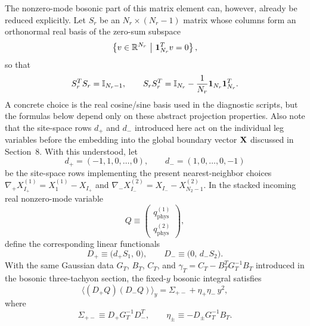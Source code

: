 \documentclass[11pt]{article}
\numberwithin{equation}{section}
\newcommand{\RR}{\mathbb{R}}
\begin{document}
The nonzero-mode bosonic part of this matrix element can, however, already be reduced explicitly. Let $S_r$ be an $N_r\times (N_r-1)$ matrix whose columns form an orthonormal real basis of the zero-sum subspace
\begin{equation}
\label{eq:s15-1-011}
\left\{v\in\RR^{N_r}~\big|~{\bf 1}_{N_r}^Tv=0\right\},
\end{equation}
so that
\begin{equation}
\label{eq:s15-1-012}
S_r^TS_r=\mathbb I_{N_r-1},
\qquad
S_rS_r^T=\mathbb I_{N_r}-\frac{1}{N_r}{\bf 1}_{N_r}{\bf 1}_{N_r}^T.
\end{equation}
A concrete choice is the real cosine/sine basis used in the diagnostic scripts, but the formulas below depend only on these abstract projection properties. Also note that the site-space rows $d_+$ and $d_-$ introduced here act on the individual leg variables before the embedding into the global boundary vector ${\bf X}$ discussed in Section~8. With this understood, let
\begin{equation}
\label{eq:s15-1-013}
d_+ = (-1,1,0,\dots,0),
\qquad
d_- = (1,0,\dots,0,-1)
\end{equation}
be the site-space rows implementing the present nearest-neighbor choices
\(
\nabla_+X_{I_+}^{(1)}=X_1^{(1)}-X_{I_+}
\)
and
\(
\nabla_-X_{I_-}^{(2)}=X_{I_-}-X_{N_2-1}^{(2)}.
\)
In the stacked incoming real nonzero-mode variable
\begin{equation}
\label{eq:s15-1-014}
Q \equiv \begin{pmatrix} q^{(1)}_{\mathrm{phys}} \\ q^{(2)}_{\mathrm{phys}} \end{pmatrix},
\end{equation}
define the corresponding linear functionals
\begin{equation}
\label{eq:s15-1-015}
D_+ \equiv \bigl(d_+S_1,\,0\bigr),
\qquad
D_- \equiv \bigl(0,\,d_-S_2\bigr).
\end{equation}
With the same Gaussian data $G_T$, $B_T$, $C_T$, and $\gamma_T=C_T-B_T^TG_T^{-1}B_T$ introduced in the bosonic three-tachyon section, the fixed-$y$ bosonic integral satisfies
\begin{equation}
\label{eq:s15-1-016}
\bigl\langle (D_+Q)(D_-Q)\bigr\rangle_y
=
\Sigma_{+-}+\eta_+\eta_-\,y^2,
\end{equation}
where
\begin{equation}
\label{eq:s15-1-017}
\Sigma_{+-}\equiv D_+G_T^{-1}D_-^T,
\qquad
\eta_\pm \equiv -D_\pm G_T^{-1}B_T.
\end{equation}
\end{document}
